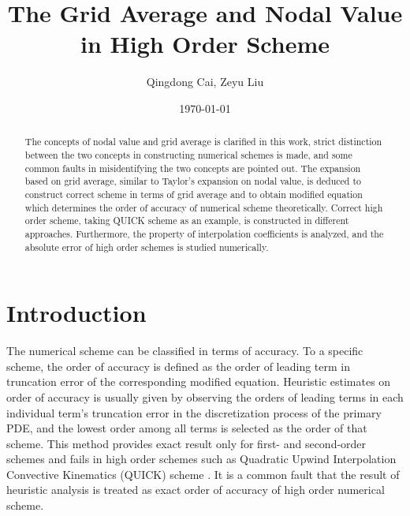 \documentclass[]{article}
\title{The Grid Average and Nodal Value in High Order Scheme}
\author{Qingdong Cai, Zeyu Liu}
\date{\today}
\begin{document}
\maketitle
\begin{abstract}
    The concepts of nodal value and grid average is clarified in this work,
    strict distinction between the two concepts in constructing
    numerical schemes is made,  and some common faults in
    misidentifying the two concepts are pointed out. 
    The expansion based on grid average,
    similar to Taylor's expansion on nodal value, is deduced to construct
    correct scheme in terms of grid average and to obtain modified equation
    which determines the order of accuracy of numerical scheme theoretically.
    Correct high order scheme, taking QUICK scheme as an example, is constructed in different
    approaches. Furthermore, the property of interpolation coefficients is analyzed, and
    the absolute error of high order schemes is studied numerically. 
\end{abstract}
\tableofcontents

\section{Introduction}\label{sec:intro}
The numerical scheme can be classified in terms of accuracy. To a 
specific scheme, the order of accuracy is defined as the order of leading term
in truncation error of the corresponding modified equation. Heuristic estimates on
order of accuracy is usually given by observing the orders of leading terms in
each individual term's truncation error in the discretization process of the
primary PDE, and the lowest order among all terms is selected as the order of that
scheme. This method provides exact result only for first- and second-order 
schemes and fails in high order schemes such as Quadratic Upwind Interpolation
Convective Kinematics (QUICK) scheme \cite{leonard1979stable}.
It is a common fault that the result of heuristic analysis is treated as exact
order of accuracy of high order numerical scheme.
\end{document}
